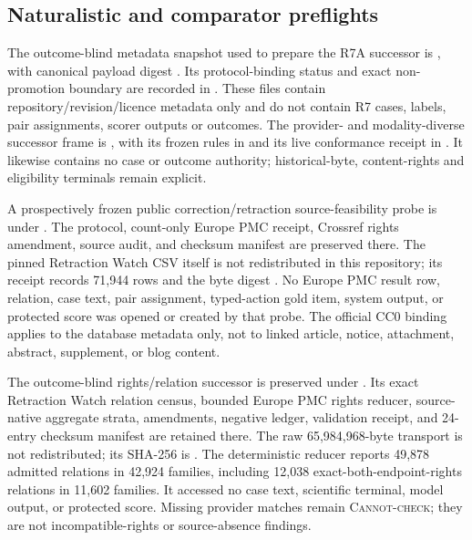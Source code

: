 \subsection{Naturalistic and comparator preflights}
The outcome-blind metadata snapshot used to prepare the R7A successor is
,
with canonical payload digest
.
Its protocol-binding status and exact non-promotion boundary are recorded in
.
These files contain repository/revision/licence metadata only and do not contain
R7 cases, labels, pair assignments, scorer outputs or outcomes.
The provider- and modality-diverse successor frame is
,
with its frozen rules in
and its live conformance receipt in
.
It likewise contains no case or
outcome authority; historical-byte, content-rights and eligibility terminals
remain explicit.

A prospectively frozen public correction/retraction source-feasibility probe is
under
. The
protocol, count-only Europe PMC receipt, Crossref rights amendment, source
audit, and checksum manifest are preserved there. The pinned Retraction Watch
CSV itself is not redistributed in this repository; its receipt records 71,944
rows and the byte digest
.
No Europe PMC result row, relation, case text, pair assignment, typed-action
gold item, system output, or protected score was opened or created by that
probe. The official CC0 binding applies to the database metadata only, not to
linked article, notice, attachment, abstract, supplement, or blog content.

The outcome-blind rights/relation successor is preserved under
. Its exact
Retraction Watch relation census, bounded Europe PMC rights reducer,
source-native aggregate strata, amendments, negative ledger, validation
receipt, and 24-entry checksum manifest are retained there. The raw
65,984,968-byte transport is not redistributed; its SHA-256 is
.
The deterministic reducer reports 49,878 admitted relations in 42,924
families, including 12,038 exact-both-endpoint-rights relations in 11,602
families. It accessed no case text, scientific terminal, model output, or
protected score. Missing provider matches remain \textsc{Cannot-check}; they
are not incompatible-rights or source-absence findings.

